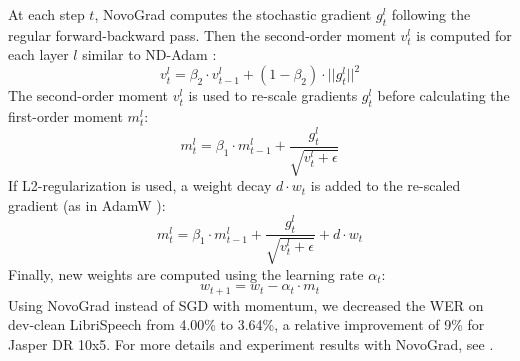 \documentclass[a4paper]{article}
\begin{document}
At each step $t$, NovoGrad computes the stochastic gradient $g^l_t$ following the regular forward-backward pass. Then the second-order moment $v^l_t$ is computed for each layer $l$ similar to ND-Adam \cite{zhang2017ndadam}:
\begin{equation}
    v^l_t = \beta_2 \cdot v^l_{t-1} + (1-\beta_2) \cdot ||g^l_t||^2
\end{equation}
The second-order moment $v^l_t$ is used to re-scale gradients $g^l_t$ before calculating the first-order moment $m^l_t$:
\begin{equation}
    m^l_t = \beta_1 \cdot m^l_{t-1} + \frac{g^l_t}{\sqrt{v^l_t+\epsilon}}
\end{equation}
If L2-regularization is used, a weight decay $d \cdot w_{t}$ is added to the re-scaled gradient (as in AdamW  \cite{loshchilov2018}): 
\begin{equation}
    m^l_t = \beta_1 \cdot m^l_{t-1} + \frac{g^l_t}{\sqrt{v^l_t + \epsilon}} + d \cdot w_{t}
\end{equation}
Finally, new weights are computed using the learning rate $\alpha_t$:
\begin{equation}
    w_{t+1} = w_{t} -\alpha_t \cdot m_t 
\end{equation}
Using NovoGrad instead of SGD with momentum, we decreased the WER on dev-clean LibriSpeech from 4.00\% to 3.64\%, a relative improvement of 9\% for Jasper DR 10x5. For more details and experiment results with NovoGrad, see \cite{novograd2019}.


\iffalse{
\section{Discussion}
Our works builds on the very similar principles as two leading end-to-end neural acoustic models: Listen-Attend-Spell (LAS) v2 \cite{Zhang2017}, and wav2letter++ \cite{zeghidour2018}. 

LAS models are attention-based NN models, based on the sequence to sequence approach which don't use CTC loss function. LAS v2 applied batch norm, ReLU, similar to Jasper, but LAS main building block is Convolutional LSTM, where inner inner products are replaced with convolutions over previous state. Note that this is completely different from Jasper 1D-convolutions which operates over time. To increase model depth, authors added 2 convolutional layers before LSTM block, similar to DeepSpeech2 model. They also added identity residual connections, since for LSTM cells residual projections didn't help much. Training and inference for Jasper are faster than for LAS since LSTM-based models  are inherently sequential. 

Jasper follows wav2letter and wav2letter++, which are both fully convolutional acoustic NN models. These are main architecture differences between wav2letter* and Jasper: we replaced 1) weight normalization with batch normalization 2) gated linear units with ReLU\. These two changes made training faster and more robust. Using ReLU and batch norm open path to fast inference since these two layers can be fused with convolutional layer. Thanks to using residual connections we can train much deeper model than wav2letter++, which has only 19 layers. 
}
\fi
\end{document}
